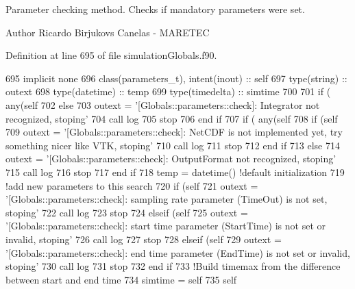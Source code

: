 Parameter checking method. Checks if mandatory parameters were set. 

\begin{DoxyAuthor}{Author}
Ricardo Birjukovs Canelas -\/ M\+A\+R\+E\+T\+EC 
\end{DoxyAuthor}


Definition at line 695 of file simulation\+Globals.\+f90.


\begin{DoxyCode}
695     \textcolor{keywordtype}{implicit none}
696     \textcolor{keywordtype}{class}(parameters\_t), \textcolor{keywordtype}{intent(inout)} :: self
697     \textcolor{keywordtype}{type}(string) :: outext
698     \textcolor{keywordtype}{type}(datetime) :: temp
699     \textcolor{keywordtype}{type}(timedelta) :: simtime
700 
701     \textcolor{keywordflow}{if} ( any(self%
702     \textcolor{keywordflow}{else}
703         outext = \textcolor{stringliteral}{'[Globals::parameters::check]: Integrator not recognized, stoping'}
704         \textcolor{keyword}{call }log%
705         stop
706 \textcolor{keywordflow}{    end if}
707     \textcolor{keywordflow}{if} ( any(self%
708         \textcolor{keywordflow}{if} (self%
709             outext = \textcolor{stringliteral}{'[Globals::parameters::check]: NetCDF is not implemented yet, try something nicer like
       VTK, stoping'}
710             \textcolor{keyword}{call }log%
711             stop
712 \textcolor{keywordflow}{        end if}
713     \textcolor{keywordflow}{else}
714         outext = \textcolor{stringliteral}{'[Globals::parameters::check]: OutputFormat not recognized, stoping'}
715         \textcolor{keyword}{call }log%
716         stop
717 \textcolor{keywordflow}{    end if}
718     temp = datetime() \textcolor{comment}{!default initialization}
719     \textcolor{comment}{!add new parameters to this search}
720     \textcolor{keywordflow}{if} (self%
721         outext = \textcolor{stringliteral}{'[Globals::parameters::check]: sampling rate parameter (TimeOut) is not set, stoping'}
722         \textcolor{keyword}{call }log%
723         stop
724     \textcolor{keywordflow}{elseif} (self%
725         outext = \textcolor{stringliteral}{'[Globals::parameters::check]: start time parameter (StartTime) is not set or invalid,
       stoping'}
726         \textcolor{keyword}{call }log%
727         stop
728     \textcolor{keywordflow}{elseif} (self%
729         outext = \textcolor{stringliteral}{'[Globals::parameters::check]: end time parameter (EndTime) is not set or invalid,
       stoping'}
730         \textcolor{keyword}{call }log%
731         stop
732 \textcolor{keywordflow}{    end if}
733     \textcolor{comment}{!Build timemax from the difference between start and end time}
734     simtime = self%
735     self%
\end{DoxyCode}
